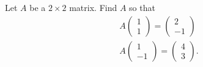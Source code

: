 \documentclass{article}
\begin{document}
\begin{exercise} \label{c4.1.8}
Let $A$ be a $2\times 2$ matrix.  Find $A$ so that
\begin{eqnarray*}
A\left(\begin{array}{r} 1 \\ 1 \end{array}\right) =
\left(\begin{array}{r} 2 \\ -1 \end{array}\right) \\
A\left(\begin{array}{r} 1 \\ -1 \end{array}\right) =
\left(\begin{array}{r} 4 \\ 3 \end{array}\right).
\end{eqnarray*}

\begin{solution}


\end{solution}
\end{exercise}
\end{document}
